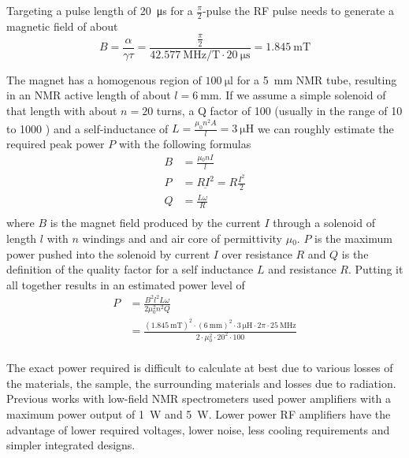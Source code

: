 Targeting a pulse length of \qty{20}{\micro\second} for a  \(\frac{\pi}{2}\)-pulse the RF pulse needs to generate a magnetic field of about
\[
    B = \frac{\alpha}{\gamma\tau} = \frac{\frac{\pi}{2}}{\qty{42.577}{\mega\hertz\per\tesla}\cdot{}\qty{20}{\micro\second}} = \qty{1.845}{\milli\tesla}
\]

The magnet has a homogenous region of \(\qty{100}{\micro\litre}\) for a \qty{5}{\milli\meter} NMR tube, resulting in an NMR active length of about \(l = \qty{6}{\milli\meter}\). If we assume a simple solenoid of that length with about \(n = 20\) turns, a Q factor of 100 (usually in the range of 10 to 1000 ) and a self-inductance of \(L = \frac{\mu_0n^2A}{l} = \qty{3}{\micro\henry}\)\sidenote{} we can roughly estimate the required peak power \(P\) with the following formulas \cite{mispelterNMRProbeheadsBiophysical2015}
\begin{align}
    B & = \frac{\mu{}_0nI}{l}              \\
    P & = R\underbar{I}^2 = R\frac{I^2}{2} \\
    Q & = \frac{L\omega}{R}                \\
\end{align}
where \(B\) is the magnet field produced by the current \(I\) through a solenoid of length \(l\) with \(n\) windings and and air core of permittivity \(\mu{}_0\). \(P\) is the maximum power pushed into the solenoid by current \(I\) over resistance \(R\) and \(Q\) is the definition of the quality factor for a self inductance \(L\) and resistance \(R\). Putting it all together results in an estimated power level of
\begin{align}
    P & = \frac{B^2l^2L\omega}{2\mu{}_0^2n^2Q}                                                                                                                                              \\
      & = \frac{(\qty{1.845}{\milli\tesla})^2 \cdot (\qty{6}{\milli\metre})^2 \cdot \qty{3}{\micro\henry} \cdot 2\pi{} \cdot \qty{25}{\mega\hertz}}{2 \cdot \mu{}_0^2 \cdot 20^2 \cdot 100} \\
\end{align}

The exact power required is difficult to calculate at best due to various losses of the materials, the sample, the surrounding materials and losses due to radiation. Previous works with low-field NMR spectrometers used power amplifiers with a maximum power output of \qty{1}{\watt}\cite{chenUltralowCostNMR2015} and \qty{5}{W}\cite{louis-josephDesigningBuildingLowcost2019}. Lower power RF amplifiers have the advantage of lower required voltages, lower noise, less cooling requirements and simpler integrated designs.

